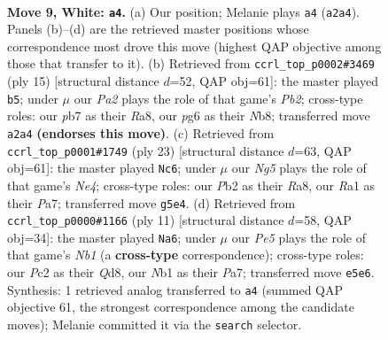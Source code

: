 \documentclass[11pt]{article}
\begin{document}
\clearpage

\begin{figure}[p]\centering
\begin{subfigure}{0.46\textwidth}\centering
\resizebox{\linewidth}{!}{%
\newchessgame
\chessboard[
  setfen={rnbqkb1r/ppp1pp1p/1n4p1/3pP1N1/3P4/1B6/PPP2PPP/RNBQ1RK1 w kq - 2 9},
  showmover=false,
  pgfstyle=straightmove, color=movearrow, markmove={a2-a4}
]}
\caption{}
\end{subfigure}\hfill
\begin{subfigure}{0.46\textwidth}\centering
\resizebox{\linewidth}{!}{%
\newchessgame
\chessboard[
  setfen={rnbq1rk1/pp2ppbp/3p1np1/3P4/4P3/2N2N1P/PP3PP1/R1BQKB1R b KQ - 0 8},
  showmover=false,
  pgfstyle=straightmove, color=movearrow, markmove={b7-b5}
]}
\caption{}
\end{subfigure}
\\[4pt]
\begin{subfigure}{0.46\textwidth}\centering
\resizebox{\linewidth}{!}{%
\newchessgame
\chessboard[
  setfen={r1bq1rk1/pp2ppbp/3p2p1/2p1n3/2P1P3/2NP2PP/PPQ2PB1/R1B2RK1 b - - 0 12},
  showmover=false,
  pgfstyle=straightmove, color=movearrow, markmove={e5-c6}
]}
\caption{}
\end{subfigure}\hfill
\begin{subfigure}{0.46\textwidth}\centering
\resizebox{\linewidth}{!}{%
\newchessgame
\chessboard[
  setfen={rnbq1rk1/ppp1ppbp/3p1np1/8/2PPP3/2N2N1P/PP3PP1/R1BQKB1R b KQ - 0 6},
  showmover=false,
  pgfstyle=straightmove, color=movearrow, markmove={b8-a6}
]}
\caption{}
\end{subfigure}
\caption{\textbf{Move 9, White: \texttt{a4}.} (a) Our position; Melanie plays \texttt{a4} (\texttt{a2a4}). Panels (b)--(d) are the retrieved master positions whose correspondence most drove this move (highest QAP objective among those that transfer to it). (b) Retrieved from \texttt{ccrl\_top\_p0002\#3469} (ply 15) [structural distance $d$=52, QAP obj=61]: the master played \texttt{b5}; under $\mu$ our \emph{Pa2} plays the role of that game's \emph{Pb2}; cross-type roles: our \emph{p}b7 as their \emph{R}a8, our \emph{p}g6 as their \emph{N}b8; transferred move \texttt{a2a4} \textbf{(endorses this move)}. (c) Retrieved from \texttt{ccrl\_top\_p0001\#1749} (ply 23) [structural distance $d$=63, QAP obj=61]: the master played \texttt{Nc6}; under $\mu$ our \emph{Ng5} plays the role of that game's \emph{Ne4}; cross-type roles: our \emph{P}b2 as their \emph{R}a8, our \emph{R}a1 as their \emph{P}a7; transferred move \texttt{g5e4}. (d) Retrieved from \texttt{ccrl\_top\_p0000\#1166} (ply 11) [structural distance $d$=58, QAP obj=34]: the master played \texttt{Na6}; under $\mu$ our \emph{Pe5} plays the role of that game's \emph{Nb1} (a \textbf{cross-type} correspondence); cross-type roles: our \emph{P}c2 as their \emph{Q}d8, our \emph{N}b1 as their \emph{P}a7; transferred move \texttt{e5e6}. Synthesis: 1 retrieved analog transferred to \texttt{a4} (summed QAP objective 61, the strongest correspondence among the candidate moves); Melanie committed it via the \texttt{search} selector.}
\label{fig:thought-m16}
\end{figure}
\end{document}
